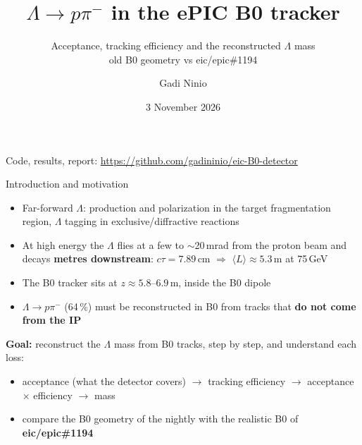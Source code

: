\documentclass[aspectratio=169,10pt]{beamer}
\title{$\Lambda\to p\pi^-$ in the ePIC B0 tracker}
\subtitle{Acceptance, tracking efficiency and the reconstructed $\Lambda$ mass\\
old B0 geometry vs eic/epic\#1194}
\author{Gadi Ninio}
\date{3 November 2026}
\begin{document}
\begin{frame}
\titlepage
\centering\footnotesize Code, results, report: \url{https://github.com/gadininio/eic-B0-detector}
\end{frame}

\begin{frame}{Introduction and motivation}
\begin{itemize}
\item Far-forward $\Lambda$: production and polarization in the target fragmentation region,
$\Lambda$ tagging in exclusive/diffractive reactions
\item At high energy the $\Lambda$ flies at a few to $\sim$20\,mrad from the proton beam and decays
\textbf{metres downstream}: $c\tau = 7.89$\,cm $\Rightarrow$ $\langle L\rangle \approx 5.3$\,m at 75\,GeV
\item The B0 tracker sits at $z \approx 5.8$--$6.9$\,m, inside the B0 dipole
\item $\Lambda\to p\pi^-$ (64\,\%) must be reconstructed in B0 from tracks that \textbf{do not come from the IP}
\end{itemize}
\vspace{2mm}
\textbf{Goal:} reconstruct the $\Lambda$ mass from B0 tracks, step by step, and understand each loss:
\begin{itemize}
\item acceptance (what the detector covers) $\to$ tracking efficiency $\to$ acceptance $\times$ efficiency $\to$ mass
\item compare the B0 geometry of the nightly with the realistic B0 of \textbf{eic/epic\#1194}
\end{itemize}
\end{frame}
\end{document}
